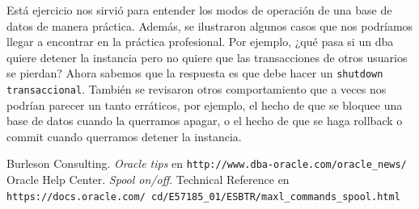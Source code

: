 \documentclass{article}
\begin{document}
Está ejercicio nos sirvió para entender los modos de operación de una base de 
datos de manera práctica. Además, se ilustraron algunos casos que nos podríamos
llegar a encontrar en la práctica profesional. Por ejemplo, ¿qué pasa si un dba
quiere detener la instancia pero no quiere que las transacciones de otros
usuarios se pierdan? Ahora sabemos que la respuesta es que debe hacer un 
\texttt{shutdown transaccional}.
También se revisaron otros comportamiento que a veces nos podrían parecer un
tanto erráticos, por ejemplo, el hecho de que se bloquee una base de datos 
cuando la querramos apagar, o el hecho de que se haga rollback o commit cuando 
querramos detener la instancia. 
\renewcommand\refname{Bibliografía y referencias}
\begin{thebibliography}{99}
     Burleson Consulting. \textit{Oracle tips } en 
    \texttt{http://www.dba-oracle.com/oracle\_news/}
     Oracle Help Center. \textit{Spool on/off}. Technical 
    Reference en 
    \texttt{https://docs.oracle.com/
    cd/E57185\_01/ESBTR/maxl\_commands\_spool.html}
\end{thebibliography}
\end{document}
